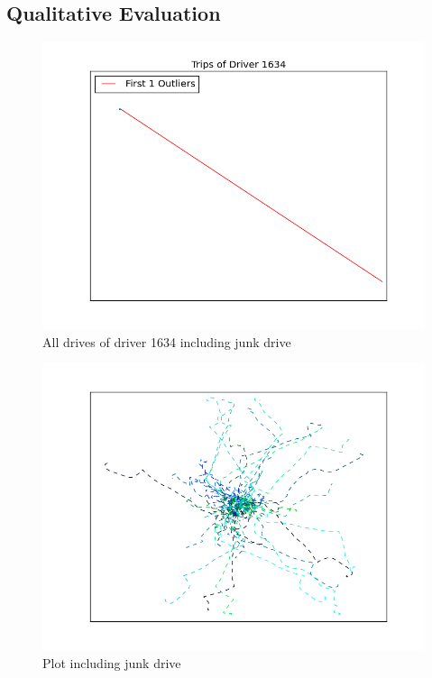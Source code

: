 \documentclass{vldb}
\begin{document}
\subsection{Qualitative Evaluation}
\begin{figure}
\centering
\includegraphics[width=\linewidth]{"pics/outliers_junk/1634_with_136"}
\caption{All drives of driver 1634 including junk drive}
\label{fig:junk-drive}
\end{figure}

\begin{figure}
\centering
\includegraphics[width=\linewidth]{"pics/outliers_junk/D_1634_wo_136"}
\caption{Plot including junk drive}
\label{fig:junk-drive}
\end{figure}
\end{document}
